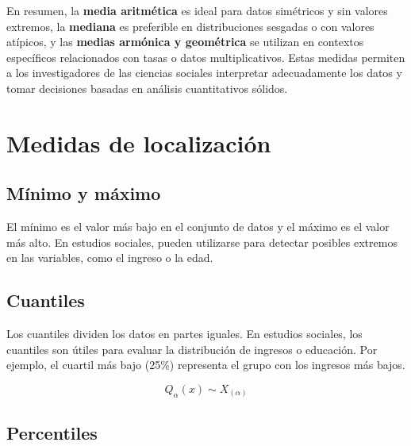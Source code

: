 \documentclass[
  letterpaper,
  DIV=11,
  numbers=noendperiod]{scrreprt}
\begin{document}
En resumen, la \textbf{media aritmética} es ideal para datos simétricos
y sin valores extremos, la \textbf{mediana} es preferible en
distribuciones sesgadas o con valores atípicos, y las \textbf{medias
armónica y geométrica} se utilizan en contextos específicos relacionados
con tasas o datos multiplicativos. Estas medidas permiten a los
investigadores de las ciencias sociales interpretar adecuadamente los
datos y tomar decisiones basadas en análisis cuantitativos sólidos.

\section{Medidas de localización}\label{medidas-de-localizaciuxf3n}

\subsection{Mínimo y máximo}\label{muxednimo-y-muxe1ximo}

El mínimo es el valor más bajo en el conjunto de datos y el máximo es el
valor más alto. En estudios sociales, pueden utilizarse para detectar
posibles extremos en las variables, como el ingreso o la edad.

\subsection{Cuantiles}\label{cuantiles}

Los cuantiles dividen los datos en partes iguales. En estudios sociales,
los cuantiles son útiles para evaluar la distribución de ingresos o
educación. Por ejemplo, el cuartil más bajo (25\%) representa el grupo
con los ingresos más bajos.

\begin{tcolorbox}[enhanced jigsaw, toprule=.15mm, opacitybacktitle=0.6, toptitle=1mm, arc=.35mm, left=2mm, title=\textcolor{quarto-callout-warning-color}{\faExclamationTriangle}\hspace{0.5em}{Warning}, titlerule=0mm, leftrule=.75mm, rightrule=.15mm, coltitle=black, bottomtitle=1mm, bottomrule=.15mm, colframe=quarto-callout-warning-color-frame, opacityback=0, colback=white, breakable, colbacktitle=quarto-callout-warning-color!10!white]

\[Q_\alpha(x)\sim X_{(\alpha)}\]

\end{tcolorbox}

\subsection{Percentiles}\label{percentiles}
\end{document}

